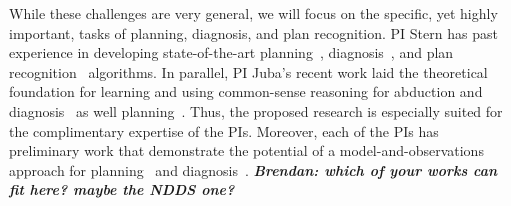 \documentclass[12pt]{article}
\newcommand{\note}[1]{\textbf{\textit{#1}}}
\begin{document}
While these challenges are very  general, we will focus on the specific, yet highly important, tasks of planning, diagnosis, and plan recognition. PI Stern has past experience in developing state-of-the-art planning~\cite{felner2004pha,sharon2013increasing,sharon2015conflict,goldenberg2014enhanced,stern2014potential,maliah2016collaborative}, diagnosis~\cite{stern2012exploring,stern2014model,stern2014hierarchical}, and plan recognition~\cite{mirsky2016sequential} algorithms. 
In parallel, PI Juba's recent work laid the theoretical foundation for learning and using common-sense reasoning for abduction and diagnosis~\cite{juba2016aaai} as well planning~\cite{juba2016jmlr}. %
Thus, the proposed research is especially suited for the complimentary expertise of the PIs. %
Moreover, each of the PIs has preliminary work that demonstrate the potential of a model-and-observations approach for planning~\cite{stern2011probably,stern2012exploring,juba2016jmlr} and diagnosis~\cite{elmishali2016dataAugmented}.
\note{Brendan: which of your works can fit here? maybe the NDDS one?}
\end{document}
